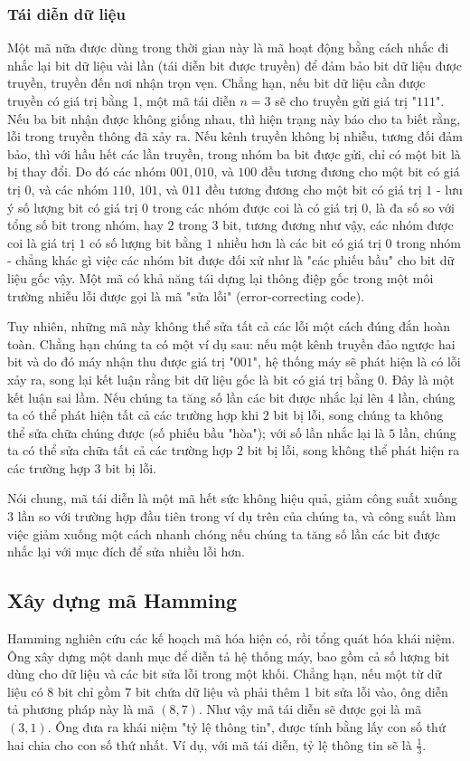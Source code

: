 \documentclass[12pt,a4paper]{article}
\begin{document}
\subsubsection{Tái diễn dữ liệu}



Một mã nữa được dùng trong thời gian này là mã hoạt động bằng cách nhắc đi nhắc lại bit dữ liệu vài lần (tái diễn bit được truyền) để đảm bảo bit dữ liệu được truyền, truyền đến nơi nhận trọn vẹn. Chẳng hạn, nếu bit dữ liệu cần được truyền có giá trị bằng 1, một mã tái diễn $n=3$ sẽ cho truyền gửi giá trị "$111$". Nếu ba bit nhận được không giống nhau, thì hiện trạng này báo cho ta biết rằng, lỗi trong truyền thông đã xảy ra. Nếu kênh truyền không bị nhiễu, tương đối đảm bảo, thì với hầu hết các lần truyền, trong nhóm ba bit được gửi, chỉ có một bit là bị thay đổi. Do đó các nhóm $001, 010$, và $100$ đều tương đương cho một bit có giá trị $0$, và các nhóm $110$, $101$, và $011$ đều tương đương cho một bit có giá trị $1$ - lưu ý số lượng bit có giá trị $0$ trong các nhóm được coi là có giá trị $0$, là đa số so với tổng số bit trong nhóm, hay $2$ trong $3$ bit, tương đương như vậy, các nhóm được coi là giá trị $1$ có số lượng bit bằng $1$ nhiều hơn là các bit có giá trị $0$ trong nhóm - chẳng khác gì việc các nhóm bit được đối xử như là "các phiếu bầu" cho bit dữ liệu gốc vậy. Một mã có khả năng tái dựng lại thông điệp gốc trong một môi trường nhiễu lỗi được gọi là mã "sửa lỗi" (error-correcting code).

Tuy nhiên, những mã này không thể sửa tất cả các lỗi một cách đúng đắn hoàn toàn. Chẳng hạn chúng ta có một ví dụ sau: nếu một kênh truyền đảo ngược hai bit và do đó máy nhận thu được giá trị "$001$", hệ thống máy sẽ phát hiện là có lỗi xảy ra, song lại kết luận rằng bit dữ liệu gốc là bit có giá trị bằng $0$. Đây là một kết luận sai lầm. Nếu chúng ta tăng số lần các bit được nhắc lại lên $4$ lần, chúng ta có thể phát hiện tất cả các trường hợp khi $2$ bit bị lỗi, song chúng ta không thể sửa chữa chúng được (số phiếu bầu "hòa"); với số lần nhắc lại là $5$ lần, chúng ta có thể sửa chữa tất cả các trường hợp $2$ bit bị lỗi, song không thể phát hiện ra các trường hợp $3$ bit bị lỗi.

Nói chung, mã tái diễn là một mã hết sức không hiệu quả, giảm công suất xuống $3$ lần so với trường hợp đầu tiên trong ví dụ trên của chúng ta, và công suất làm việc giảm xuống một cách nhanh chóng nếu chúng ta tăng số lần các bit được nhắc lại với mục đích để sửa nhiều lỗi hơn.
\subsection{Xây dựng mã Hamming}
Hamming nghiên cứu các kế hoạch mã hóa hiện có, rồi tổng quát hóa khái niệm. Ông xây dựng một danh mục để diễn tả hệ thống máy, bao gồm cả số lượng bit dùng cho dữ liệu và các bit sửa lỗi trong một khối. Chẳng hạn, nếu một từ dữ liệu có 8 bit chỉ gồm 7 bit chứa dữ liệu và phải thêm 1 bit sửa lỗi vào, ông diễn tả phương pháp này là mã $(8, 7)$. Như vậy mã tái diễn sẽ được gọi là mã $(3, 1)$. Ông đưa ra khái niệm "tỷ lệ thông tin", được tính bằng lấy con số thứ hai chia cho con số thứ nhất. Ví dụ, với mã tái diễn, tỷ lệ thông tin sẽ là $\frac{1}{3}$.\\
\end{document}
